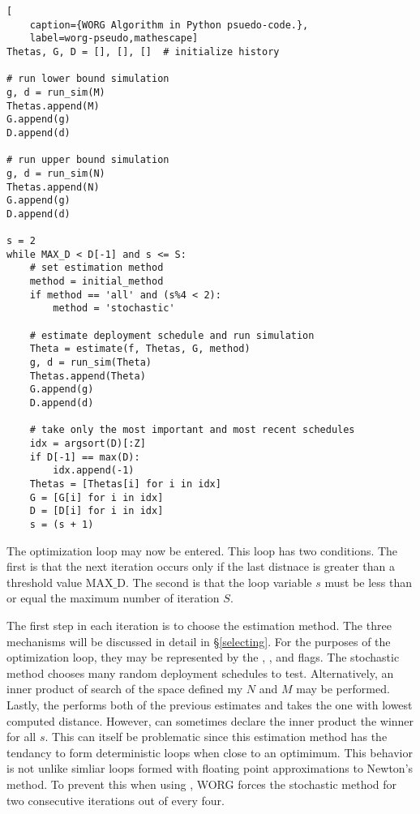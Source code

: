 \clearpage
\begin{lstlisting}[
    caption={WORG Algorithm in Python psuedo-code.},
    label=worg-pseudo,mathescape]
Thetas, G, D = [], [], []  # initialize history

# run lower bound simulation
g, d = run_sim(M)
Thetas.append(M)
G.append(g)
D.append(d)

# run upper bound simulation    
g, d = run_sim(N)
Thetas.append(N)
G.append(g)
D.append(d)

s = 2
while MAX_D < D[-1] and s <= S:
    # set estimation method
    method = initial_method
    if method == 'all' and (s%4 < 2):
        method = 'stochastic'

    # estimate deployment schedule and run simulation
    Theta = estimate(f, Thetas, G, method)
    g, d = run_sim(Theta)
    Thetas.append(Theta)
    G.append(g)
    D.append(d)

    # take only the most important and most recent schedules
    idx = argsort(D)[:Z]
    if D[-1] == max(D):
        idx.append(-1)
    Thetas = [Thetas[i] for i in idx]
    G = [G[i] for i in idx]
    D = [D[i] for i in idx]
    s = (s + 1)
\end{lstlisting}
\clearpage

The optimization loop may now be entered.  This loop has two conditions.
The first is that the next iteration occurs only if the last distnace
is greater than a threshold value $\mathrm{MAX\_D}$. The second is that 
the loop variable $s$ must be less than or equal the maximum number
of iteration $S$.

The first step in each iteration is to choose the estimation method. The
three mechanisms will be discussed in detail in \S\ref{selecting}. For
the purposes of the optimization loop, they may be represented by the 
\stochastic, \innerprod, and \allflag flags. The stochastic method 
chooses many random deployment schedules to test. Alternatively, an inner
product of search of the space defined my $N$ and $M$ may be performed. 
Lastly, the \allflag performs both of the previous estimates and takes
the one with lowest computed distance.  However, \allflag can sometimes
declare the inner product the winner for all $s$.  This can itself 
be problematic since this estimation method has the tendancy to form 
deterministic loops when close to an optimimum. This behavior is not unlike
simliar loops formed with floating point approximations to Newton's method.
To prevent this when using \allflag, WORG forces the stochastic method
for two consecutive iterations out of every four.  
 


